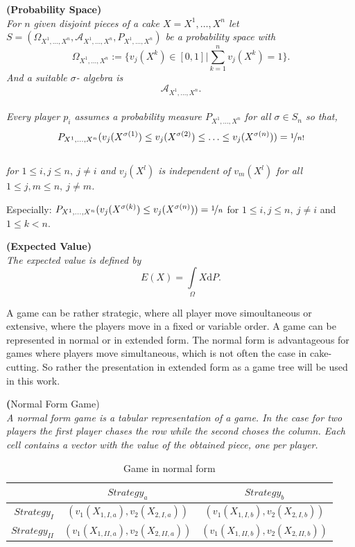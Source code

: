 \begin{defi}{\textbf{(Probability Space)}}\\
\emph{For $n$ given disjoint pieces of a cake $X=X^1, \ldots, X^n$ let\\$S=(\Omega_{X^1, \ldots, X^n}, \mathcal{A}_{X^1, \ldots, X^n},{P}_{X^1, \ldots, X^n})$ be a \emph{probability space} with $$\Omega_{X^1, \ldots, X^n}:=\{v_j(X^k)\in [0,1]| \sum\limits_{k=1}^n v_j(X^k)=1\}.$$ And a suitable $\sigma$- algebra is\\ $$\mathcal{A}_{X^1, \ldots, X^n}.$$\\ Every player $p_i$ assumes a probability measure ${P}_{X^1, \ldots, X^n}$ for all $\sigma \in S_n$ so that,\\
$${P}_{X^1, \ldots, X^n}(v_j(X^{\sigma(1)})\leq v_j(X^{\sigma(2)})\leq \ldots \leq v_j(X^{\sigma(n)}))=\nicefrac{1}{n!}$$\\for $1 \leq i,j \leq n,\: j\neq i$ and $v_j(X^l)$ is independent of $v_m(X^l)$ for all $1 \leq j,m \leq n,\: j \neq m$.} 
\end{defi}
Especially: ${P}_{X^1, \ldots, X^n}(v_j(X^{\sigma(k)})\leq v_j(X^{\sigma(n)}))=\nicefrac{1}{n}$ for $1 \leq i,j \leq n,\: j\neq i$ and $1 \leq k < n.$
\begin{defi}{\textbf{(Expected Value)}}\\
\emph{The \emph{expected value} is defined by $$E(X)=\int\limits_{\Omega} X \mathrm{d}P.$$} 
\end{defi}
A game can be rather strategic, where all player move simoultaneous or extensive, where the players move in a fixed or variable order. A game can be represented in normal or in extended form. The normal form is advantageous for games where players move simultaneous, which is not often the case in cake-cutting. So rather the presentation in extended form as a game tree will be used in this work.
\begin{defi}\textbf({Normal Form Game)}\\
\emph{A \emph{normal form game} is a tabular representation of a game. In the case for two players the first player chases the row while the second choses the column. Each cell contains a vector with the value of the obtained piece, one per player.}
\end{defi}
\begin{table}[htb]
\centering
 \renewcommand{\arraystretch}{1.2} 
\begin{tabular}{c|c|c|}
\cline{2-3}
&\multicolumn{1}{|c|}{$Strategy_a$}& {$Strategy_b$}\\
\hline
\multicolumn{1}{|r|}{$Strategy_I$}&$\left(v_1(X_{1,I,a}), v_2(X_{2,I,a}) \right)$&$\left(v_1(X_{1,I,b}), v_2(X_{2,I,b}) \right)$\\
\hline
\multicolumn{1}{|r|}{$Strategy_{II}$}&$\left(v_1(X_{1,II,a}), v_2(X_{2,II,a}) \right)$&$\left(v_1(X_{1,II,b}), v_2(X_{2,II,b}) \right)$\\
\hline
\end{tabular}
\caption{Game in normal form}\label{Table0}
\end{table}
